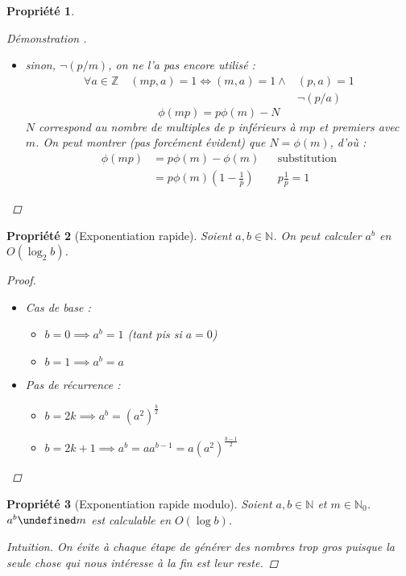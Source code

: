 \documentclass[11pt,twocolumn]{article}
\let\mod\undefined
\DeclareMathOperator{\mod}{mod}
\theoremstyle{plain}
\newtheorem{pr}{Propriété}
\newcommand{\esN}{\mathbb{N}} %
\newcommand{\esZ}{\mathbb{Z}} %
\newcommand{\dbi}{\Longleftrightarrow}
\newenvironment{cproof}[1]{\begin{proof}[Démonstration \cite{#1}]}{\end{proof}}
\begin{document}
\begin{pr}
\begin{cproof}{Buys}
\begin{itemize}
\begin{align*}
					&\dbi (m,a+km)=1
				\end{align*}
				\[
					[1;mp] = \bigcup_{k=0}^{p-1}[km+1;km+m]
				\]
				Dans chaque ensemble de cette partition,
				$\phi(m)$ éléments sont inférieurs et
				premiers avec $mp$ : \[
					\phi(mp)=p\phi(m)
				\]
			\item sinon, $\lnot(p/m)$, on ne l'a pas encore utilisé :
				\begin{align*}
					\forall a \in \esZ \quad (mp,a)=1
					\dbi (m,a)=1 \land& (p,a)=1 \\
					& \lnot(p/a)
				\end{align*}
				\[
					\phi(mp)=p\phi(m)-N
				\]
				$N$ correspond au nombre de multiples de $p$
				inférieurs à $mp$ et premiers avec $m$.
				On peut montrer (pas forcément évident) que $N=\phi(m)$, d'où :
				\begin{align*}
					\phi(mp) &= p\phi(m) - \phi(m) && \text{substitution} \\
					&= p\phi(m)\left(1-\frac1p\right) && p\frac1p=1
				\end{align*}
		\end{itemize}
	\end{cproof}
\end{pr}
\begin{pr}[Exponentiation rapide]\label{pr:fastexp}
	Soient $a,b \in \esN$.
	On peut calculer $a^b$ en $O(\log_2b)$.
	\begin{proof} ~
		\begin{itemize}
			\item Cas de base :
				\begin{itemize}
					\item $b=0 \implies a^b = 1$ (tant pis si $a=0$)
					\item $b=1 \implies a^b = a$
				\end{itemize}
			\item Pas de récurrence :
				\begin{itemize}
					\item $b=2k \implies a^b =
						\left(a^2\right)^\frac{b}2$
					\item $b=2k+1 \implies a^b =
						aa^{b-1}=a\left(a^2\right)^{\frac{b-1}2}$
				\end{itemize}
		\end{itemize}
	\end{proof}
\end{pr}
\begin{pr}[Exponentiation rapide modulo]
	Soient $a,b \in \esN$ et $m \in \esN_0$.
	$a^b \mod m$ est calculable en $O(\log b)$.
	\begin{proof}[Intuition]
		On évite à chaque étape de générer des nombres trop gros puisque
		la seule chose qui nous intéresse à la fin est leur reste.
	\end{proof}
\end{pr}
\end{document}
